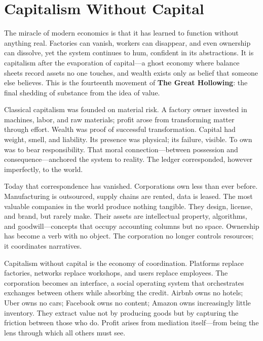\documentclass[11pt,twoside]{book}
\begin{document}
\chapter{Capitalism Without Capital}
\label{ch:14}

The miracle of modern economics is that it has learned to function without anything real.  
Factories can vanish, workers can disappear, and even ownership can dissolve, yet the system continues to hum, confident in its abstractions.  It is capitalism after the evaporation of capital—a ghost economy where balance sheets record assets no one touches, and wealth exists only as belief that someone else believes.  This is the fourteenth movement of \textbf{The Great Hollowing}: the final shedding of substance from the idea of value.

Classical capitalism was founded on material risk.  A factory owner invested in machines, labor, and raw materials; profit arose from transforming matter through effort.  Wealth was proof of successful transformation.  Capital had weight, smell, and liability.  Its presence was physical; its failure, visible.  To own was to bear responsibility.  That moral connection—between possession and consequence—anchored the system to reality.  The ledger corresponded, however imperfectly, to the world.

Today that correspondence has vanished.  Corporations own less than ever before.  Manufacturing is outsourced, supply chains are rented, data is leased.  The most valuable companies in the world produce nothing tangible.  They design, license, and brand, but rarely make.  Their assets are intellectual property, algorithms, and goodwill—concepts that occupy accounting columns but no space.  Ownership has become a verb with no object.  The corporation no longer controls resources; it coordinates narratives.

Capitalism without capital is the economy of coordination.  Platforms replace factories, networks replace workshops, and users replace employees.  The corporation becomes an interface, a social operating system that orchestrates exchanges between others while absorbing the credit.  Airbnb owns no hotels; Uber owns no cars; Facebook owns no content; Amazon owns increasingly little inventory.  They extract value not by producing goods but by capturing the friction between those who do.  Profit arises from mediation itself—from being the lens through which all others must see.
\end{document}
